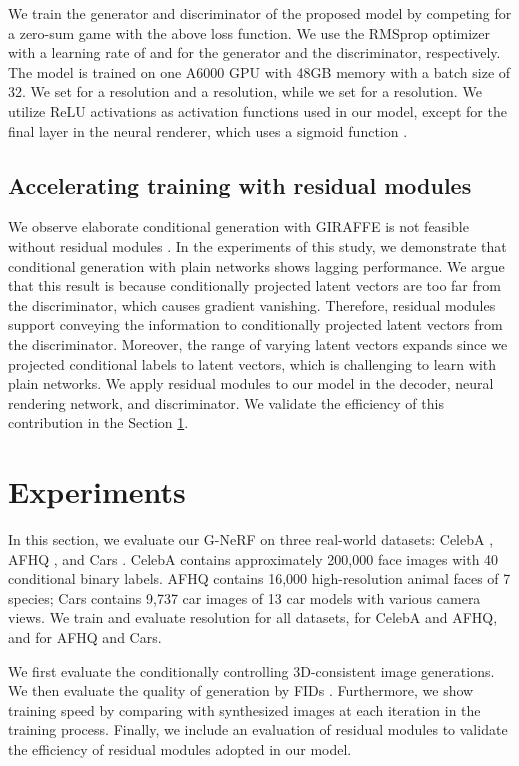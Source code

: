 \documentclass[nohyperref]{article}
\theoremstyle{plain}
\theoremstyle{definition}
\theoremstyle{remark}
\begin{document}
We train the generator and discriminator of the proposed model by competing for a zero-sum game with the above loss function. We use the RMSprop optimizer \cite{rmsprop} with a learning rate of  and  for the generator and the discriminator, respectively. The model is trained on one A6000 GPU with 48GB memory with a batch size of 32. We set  for a  resolution and a  resolution, while we set  for a  resolution. We utilize ReLU activations \cite{relu} as activation functions used in our model, except for the final layer in the neural renderer, which uses a sigmoid function \cite{ramachandran2017searching}.



\subsection{Accelerating training with residual modules}
We observe elaborate conditional generation with GIRAFFE is not feasible without residual modules \cite{he2016deep, mescheder2018training}. In the experiments of this study, we demonstrate that conditional generation with plain networks shows lagging performance. We argue that this result is because conditionally projected latent vectors are too far from the discriminator, which causes gradient vanishing. Therefore, residual modules support conveying the information to conditionally projected latent vectors from the discriminator. Moreover, the range of varying latent vectors expands since we projected conditional labels to latent vectors, which is challenging to learn with plain networks. We apply residual modules to our model in the decoder, neural rendering network, and discriminator. We validate the efficiency of this contribution in the Section \ref{experiments}.


\section{Experiments}
\label{experiments}
In this section, we evaluate our G-NeRF on three real-world datasets: CelebA \cite{liu2015deep}, AFHQ \cite{choi2020stargan}, and Cars \cite{ashrafi_2022}. CelebA contains approximately 200,000 face images with 40 conditional binary labels. AFHQ contains 16,000 high-resolution animal faces of 7 species; Cars contains 9,737 car images of 13 car models with various camera views. We train and evaluate  resolution for all datasets,  for CelebA and AFHQ, and  for AFHQ and Cars.

We first evaluate the conditionally controlling 3D-consistent image generations. We then evaluate the quality of generation by FIDs \cite{ttur}. Furthermore, we show training speed by comparing with synthesized images at each iteration in the training process. Finally, we include an evaluation of residual modules to validate the efficiency of residual modules adopted in our model.
\end{document}
